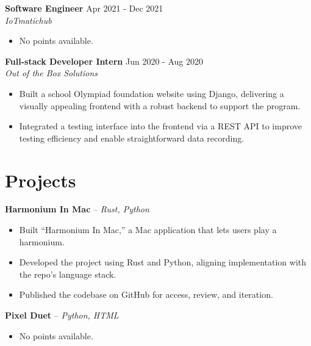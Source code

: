 \documentclass[a4paper,10pt]{article}
\begin{document}
\vspace{-6pt}
\textbf{Software Engineer} \hfill Apr 2021 - Dec 2021 \\
\textit{IoTmatichub}
\begin{itemize}
\item No points available.
\end{itemize}
\vspace{-6pt}
\textbf{Full-stack Developer Intern} \hfill Jun 2020 - Aug 2020 \\
\textit{Out of the Box Solutions}
\begin{itemize}
\item Built a school Olympiad foundation website using Django, delivering a visually appealing frontend with a robust backend to support the program.
\item Integrated a testing interface into the frontend via a REST API to improve testing efficiency and enable straightforward data recording.
\end{itemize}


\vspace{-8pt}
\section*{Projects}
\vspace{-3pt}
\textbf{Harmonium In Mac} -- \textit{Rust, Python}
\begin{itemize}
    \item Built “Harmonium In Mac,” a Mac application that lets users play a harmonium.
\item Developed the project using Rust and Python, aligning implementation with the repo’s language stack.
\item Published the codebase on GitHub for access, review, and iteration.
\end{itemize}
\vspace{0pt}
\textbf{Pixel Duet} -- \textit{Python, HTML}
\begin{itemize}
    \item No points available.
\end{itemize}


\vspace{-8pt}
\end{document}
